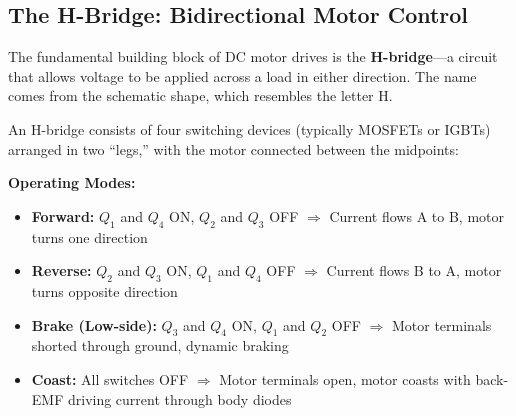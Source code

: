 \subsection{The H-Bridge: Bidirectional Motor Control}

The fundamental building block of DC motor drives is the \textbf{H-bridge}---a circuit that allows voltage to be applied across a load in either direction. The name comes from the schematic shape, which resembles the letter H.

An H-bridge consists of four switching devices (typically MOSFETs or IGBTs) arranged in two ``legs,'' with the motor connected between the midpoints:

\begin{center}
\end{center}

\textbf{Operating Modes:}

\begin{itemize}
    \item \textbf{Forward:} $Q_1$ and $Q_4$ ON, $Q_2$ and $Q_3$ OFF $\Rightarrow$ Current flows A to B, motor turns one direction
    \item \textbf{Reverse:} $Q_2$ and $Q_3$ ON, $Q_1$ and $Q_4$ OFF $\Rightarrow$ Current flows B to A, motor turns opposite direction
    \item \textbf{Brake (Low-side):} $Q_3$ and $Q_4$ ON, $Q_1$ and $Q_2$ OFF $\Rightarrow$ Motor terminals shorted through ground, dynamic braking
    \item \textbf{Coast:} All switches OFF $\Rightarrow$ Motor terminals open, motor coasts with back-EMF driving current through body diodes
\end{itemize}

